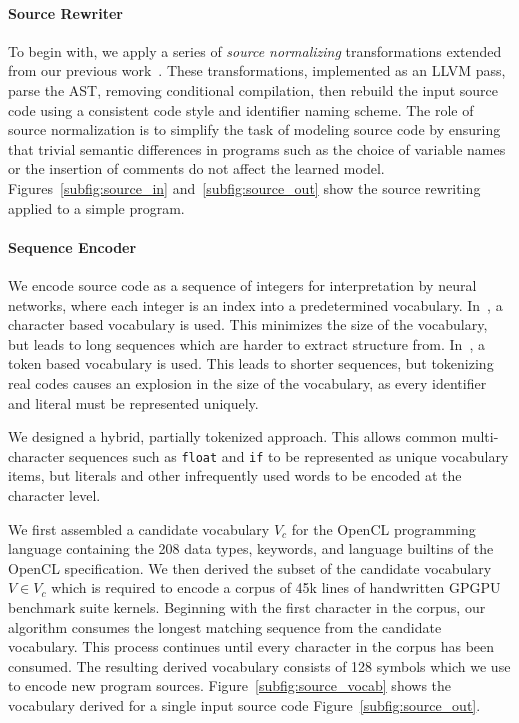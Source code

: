 \paragraph{Source Rewriter} To begin with, we apply a series of \emph{source
normalizing} transformations extended from our previous
work~\cite{Cummins2017a}. These transformations, implemented as an LLVM pass,
parse the AST, removing conditional compilation, then rebuild the input source
code using a consistent code style and identifier naming scheme. The role of
source normalization is to simplify the task of modeling source code by ensuring
that trivial semantic differences in programs such as the choice of variable
names or the insertion of comments do not affect the learned model.
Figures~\ref{subfig:source_in} and~\ref{subfig:source_out} show the source
rewriting applied to a simple program.

\paragraph{Sequence Encoder}  We encode source code as a sequence of integers
for interpretation by neural networks, where each integer is an index into a
predetermined vocabulary. In~\cite{Cummins2017a}, a character based vocabulary
is used. This minimizes the size of the vocabulary, but leads to long sequences
which are harder to extract structure from. In~\cite{Allamanis2013a}, a token
based vocabulary is used. This leads to shorter sequences, but tokenizing real
codes causes an explosion in the size of the vocabulary, as every identifier and
literal must be represented uniquely.

We designed a hybrid, partially tokenized approach. This allows common multi-
character sequences such as \texttt{float} and \texttt{if} to be represented as
unique vocabulary items, but literals and other infrequently used words to be
encoded at the character level.

We first assembled a candidate vocabulary $V_c$ for the OpenCL programming
language containing the 208 data types, keywords, and language builtins of the
OpenCL specification. We then derived the subset of the candidate vocabulary $V
\in V_c$ which is required to encode a corpus of 45k lines of handwritten GPGPU
benchmark suite kernels. Beginning with the first character in the corpus, our
algorithm consumes the longest matching sequence from the candidate vocabulary.
This process continues until every character in the corpus has been consumed.
The resulting derived vocabulary consists of 128 symbols which we use to encode
new program sources. Figure~\ref{subfig:source_vocab} shows the vocabulary
derived for a single input source code Figure~\ref{subfig:source_out}.

